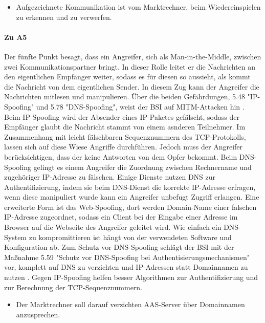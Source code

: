 \documentclass[11pt,a4paper]{report}
\begin{document}
\begin{itemize}[leftmargin=*]
\item Aufgezeichnete Kommunikation ist vom Marktrechner, beim Wiedereinspielen zu erkennen und zu verwerfen.
\end{itemize}

\paragraph{Zu A5} Der fünfte Punkt besagt, dass ein Angreifer, sich als Man-in-the-Middle, zwischen zwei Kommunikationspartner bringt. In dieser Rolle leitet er die Nachrichten an den eigentlichen Empfänger weiter, sodass es für diesen so aussieht, als kommt die Nachricht von dem eigentlichen Sender. In diesem Zug kann der Angreifer die Nachrichten mitlesen und manipulieren. Über die beiden Gefährdungen, 5.48 "IP-Spoofing" und 5.78 "DNS-Spoofing", weist der BSI auf MITM-Attacken hin \cite{bsi_g5048, bsi_g5078}. Beim IP-Spoofing wird der Absender eines IP-Paketes gefälscht, sodass der Empfänger glaubt die Nachricht stammt von einem asnderen Teilnehmer. Im Zusammenhang mit leicht fälschbaren Sequenznummern des TCP-Protokolls, lassen sich auf diese Wiese Angriffe durchführen. Jedoch muss der Angreifer berücksichtigen, dass der keine Antworten von dem Opfer bekommt. Beim DNS-Spoofing gelingt es einem Angreifer die Zuordnung zwischen Rechnername und zugehöriger IP-Adresse zu fälschen. Einige Dienste nutzen DNS zur Authentifizierung, indem sie beim DNS-Dienst die korrekte IP-Adresse erfragen, wenn diese manipuliert wurde kann ein Angreifer unbefugt Zugriff erlangen. Eine erweiterte Form ist das Web-Spoofing, dort werden Domain-Name einer falschen IP-Adresse zugeordnet, sodass ein Client bei der Eingabe einer Adresse im Browser auf die Webseite des Angreifer geleitet wird. Wie einfach ein DNS-System zu kompromittieren ist hängt von der verwendeten Software und Konfiguration ab. Zum Schutz vor DNS-Spoofing schlägt der BSI mit der Maßnahme 5.59 "Schutz vor DNS-Spoofing bei Authentisierungsmechanismen" vor, komplett auf DNS zu verzichten und IP-Adressen statt Domainnamen zu nutzen \cite{bsi_m5059}. Gegen IP-Spoofing helfen besser Algorithmen zur Authentifizierung und zur Berechnung der TCP-Sequenznummern.

\begin{itemize}[leftmargin=*]
\item Der Marktrechner soll darauf verzichten AAS-Server über Domainnamen anzusprechen.
\end{itemize}
\end{document}
